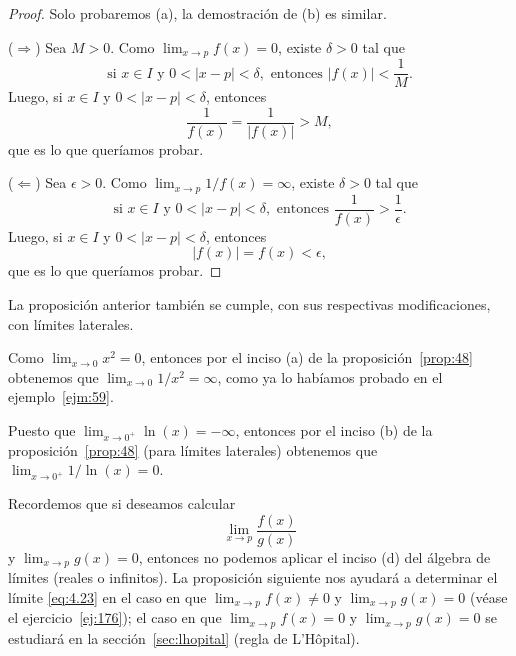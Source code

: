 \documentclass[12pt,a4paper]{book}
\begin{document}
    \begin{proof}
        Solo probaremos (a), la demostración de (b) es similar.

        ($\Rightarrow$) Sea $M>0$. Como $\lim_{x\to p}f(x)=0$, existe $\delta>0$ tal que
        \begin{equation*}
            \text{si }x\in I\text{ y }0<|x-p|<\delta,\text{ entonces }|f(x)|<\frac{1}{M}.
        \end{equation*}
        Luego, si $x\in I$ y $0<|x-p|<\delta$, entonces
        \begin{equation*}
            \frac{1}{f(x)}=\frac{1}{|f(x)|}>M,
        \end{equation*}
        que es lo que queríamos probar.

        ($\Leftarrow$) Sea $\epsilon>0$. Como $\lim_{x\to p}1/f(x)=\infty$, existe $\delta>0$ tal que
        \begin{equation*}
            \text{si }x\in I\text{ y }0<|x-p|<\delta,\text{ entonces }\frac{1}{f(x)}>\frac{1}{\epsilon}.
        \end{equation*}
        Luego, si $x\in I$ y $0<|x-p|<\delta$, entonces
        \begin{equation*}
            |f(x)|=f(x)<\epsilon,
        \end{equation*}
        que es lo que queríamos probar.
    \end{proof}

    La proposición anterior también se cumple, con sus respectivas modificaciones,
    con límites laterales.

    \begin{ejemplo}\label{ejm:62}
        Como $\lim_{x\to 0}x^{2}=0$, entonces por el inciso (a) de la proposición~\ref{prop:48}
        obtenemos que $\lim_{x\to 0}1/x^{2}=\infty$, como ya lo habíamos probado en
        el ejemplo~\ref{ejm:59}.
    \end{ejemplo}

    \begin{ejemplo}\label{ejm:63}
        Puesto que $\lim_{x\to 0^{+}}\ln(x)=-\infty$, entonces por el inciso (b) de
        la proposición~\ref{prop:48} (para límites laterales) obtenemos que $\lim_{x\to 0^{+}}1/\ln(x)=
        0$.
    \end{ejemplo}

    Recordemos que si deseamos calcular
    \begin{equation}\label{eq:4.23}
        \lim_{x\to p}\frac{f(x)}{g(x)}
    \end{equation}
    y $\lim_{x\to p}g(x)=0$, entonces no podemos aplicar el inciso (d) del álgebra de
    límites (reales o infinitos). La proposición siguiente nos ayudará a determinar
    el límite \eqref{eq:4.23} en el caso en que $\lim_{x\to p}f(x)\neq 0$ y $\lim_{x\to p}g(x)=0$ (véase el
    ejercicio~\ref{ej:176}); el caso en que $\lim_{x\to p}f(x)=0$ y $\lim_{x\to p}g(x)=0$ se estudiará
    en la sección~\ref{sec:lhopital} (regla de L'Hôpital).
\end{document}

